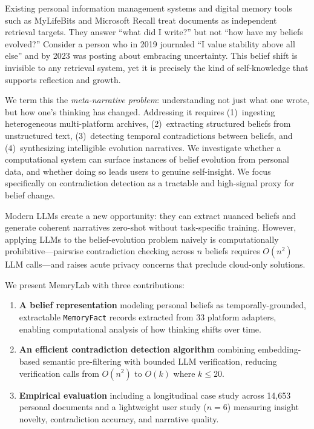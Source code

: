 \documentclass[pdflatex,sn-mathphys-num]{sn-jnl}
\begin{document}
Existing personal information management systems \cite{jones2007pim,lansdale1988psychology} and digital memory tools such as MyLifeBits \cite{gemmell2002mylifebits} and Microsoft Recall \cite{microsoft2024recall} treat documents as independent retrieval targets. They answer ``what did I write?'' but not ``how have my beliefs evolved?'' Consider a person who in 2019 journaled ``I value stability above all else'' and by 2023 was posting about embracing uncertainty. This belief shift is invisible to any retrieval system, yet it is precisely the kind of self-knowledge that supports reflection and growth.

We term this the \emph{meta-narrative problem}: understanding not just what one wrote, but how one's thinking has changed. Addressing it requires (1)~ingesting heterogeneous multi-platform archives, (2)~extracting structured beliefs from unstructured text, (3)~detecting temporal contradictions between beliefs, and (4)~synthesizing intelligible evolution narratives. We investigate whether a computational system can surface instances of belief evolution from personal data, and whether doing so leads users to genuine self-insight. We focus specifically on contradiction detection as a tractable and high-signal proxy for belief change.

Modern LLMs create a new opportunity: they can extract nuanced beliefs and generate coherent narratives zero-shot \cite{brown2020gpt3,touvron2023llama} without task-specific training. However, applying LLMs to the belief-evolution problem naively is computationally prohibitive---pairwise contradiction checking across $n$ beliefs requires $O(n^2)$ LLM calls---and raises acute privacy concerns that preclude cloud-only solutions.

We present MemryLab with three contributions:

\begin{enumerate}
    \item \textbf{A belief representation} modeling personal beliefs as temporally-grounded, extractable \texttt{MemoryFact} records extracted from 33 platform adapters, enabling computational analysis of how thinking shifts over time.
    \item \textbf{An efficient contradiction detection algorithm} combining embedding-based semantic pre-filtering with bounded LLM verification, reducing verification calls from $O(n^2)$ to $O(k)$ where $k \leq 20$.
    \item \textbf{Empirical evaluation} including a longitudinal case study across 14,653 personal documents and a lightweight user study ($n{=}6$) measuring insight novelty, contradiction accuracy, and narrative quality.
\end{enumerate}
\end{document}
